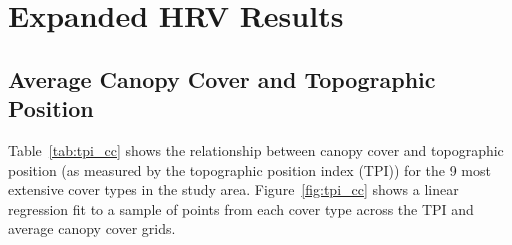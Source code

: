 \chapter{Expanded HRV Results}
\label{app:full-results}





\section{Average Canopy Cover and Topographic Position}
Table~\ref{tab:tpi_cc} shows the relationship between canopy cover and topographic position (as measured by the topographic position index (TPI)) for the 9 most extensive cover types in the study area. Figure~\ref{fig:tpi_cc} shows a linear regression fit to a sample of points from each cover type across the TPI and average canopy cover grids.

